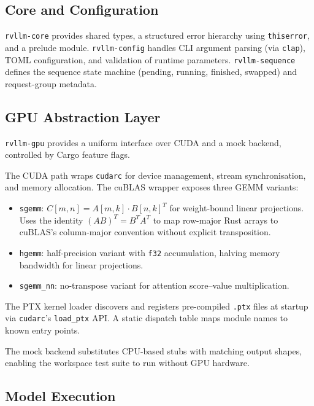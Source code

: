 \subsection{Core and Configuration}

\texttt{rvllm-core} provides shared types, a structured error hierarchy using
\texttt{thiserror}, and a prelude module. \texttt{rvllm-config} handles CLI argument
parsing (via \texttt{clap}), TOML configuration, and validation of runtime
parameters. \texttt{rvllm-sequence} defines the sequence state machine
(pending, running, finished, swapped) and request-group metadata.

\subsection{GPU Abstraction Layer}

\texttt{rvllm-gpu} provides a uniform interface over CUDA and a mock backend,
controlled by Cargo feature flags.

The CUDA path wraps \texttt{cudarc} for device management, stream synchronisation,
and memory allocation. The cuBLAS wrapper exposes three GEMM variants:

\begin{itemize}
  \item \texttt{sgemm}: $C[m,n] = A[m,k] \cdot B[n,k]^T$ for weight-bound linear
        projections. Uses the identity $(AB)^T = B^T A^T$ to map row-major Rust arrays
        to cuBLAS's column-major convention without explicit transposition.
  \item \texttt{hgemm}: half-precision variant with \texttt{f32} accumulation, halving
        memory bandwidth for linear projections.
  \item \texttt{sgemm\_nn}: no-transpose variant for attention score--value
        multiplication.
\end{itemize}

The PTX kernel loader discovers and registers pre-compiled \texttt{.ptx} files at
startup via \texttt{cudarc}'s \texttt{load\_ptx} API. A static dispatch table maps
module names to known entry points.

The mock backend substitutes CPU-based stubs with matching output shapes, enabling
the workspace test suite to run without GPU hardware.

\subsection{Model Execution}

